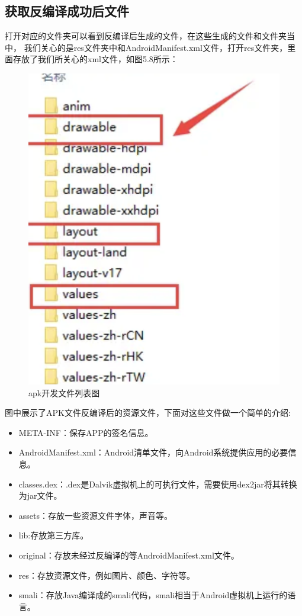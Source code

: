   \subsection{获取反编译成功后文件}
  打开对应的文件夹可以看到反编译后生成的文件，在这些生成的文件和文件夹当中，
  我们关心的是res文件夹中和AndroidManifest.xml文件，打开res文件夹，里面存放了我们所关心的xml文件，如图5.8所示：
  \begin{figure}
    \centering
    \includegraphics[scale=0.5]{resources/img/i20.png}
    \caption{apk开发文件列表图}
  \end{figure}
  图中展示了APK文件反编译后的资源文件，下面对这些文件做一个简单的介绍:
  \begin{itemize}
    \item META-INF：保存APP的签名信息。
    \item AndroidManifest.xml：Android清单文件，向Android系统提供应用的必要信息。
    \item classes.dex：.dex是Dalvik虚拟机上的可执行文件，需要使用dex2jar将其转换为jar文件。
    \item assets：存放一些资源文件字体，声音等。
    \item lib:存放第三方库。
    \item original：存放未经过反编译的等AndroidManifest.xml文件。
    \item res：存放资源文件，例如图片、颜色、字符等。
    \item smali：存放Java编译成的smali代码，smali相当于Android虚拟机上运行的语言。
\end{itemize}
